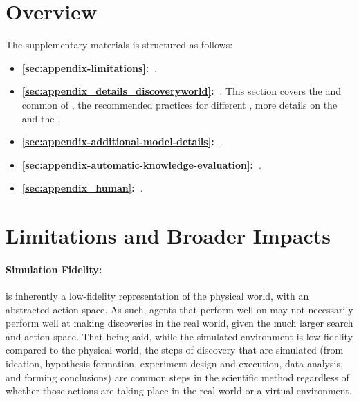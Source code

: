 
\section{Overview}
The supplementary materials is structured as follows:
\begin{itemize}
    \item \textbf{\autoref{sec:appendix-limitations}:~}.
    \item \textbf{\autoref{sec:appendix_details_discoveryworld}:~}. This section covers the \textit{} and common \textit{} of \env, the recommended practices for different \textit{}, more details on the \textit{} and the \textit{}.
    
    \item \textbf{\autoref{sec:appendix-additional-model-details}:~}.

    \item \textbf{\autoref{sec:appendix-automatic-knowledge-evaluation}:~}.

    \item \textbf{\autoref{sec:appendix_human}:~}.
\end{itemize}

\clearpage

\section{Limitations and Broader Impacts}
\label{sec:appendix-limitations}

\paragraph{Simulation Fidelity:} \env is inherently a low-fidelity representation of the physical world, with an abstracted action space.  As such, agents that perform well on \env may not necessarily perform well at making discoveries in the real world, given the much larger search and action space.  That being said, while the simulated environment is low-fidelity compared to the physical world, the steps of discovery that are simulated (from ideation, hypothesis formation, experiment design and execution, data analysis, and forming conclusions) are common steps in the scientific method regardless of whether those actions are taking place in the real world or a virtual environment. 

